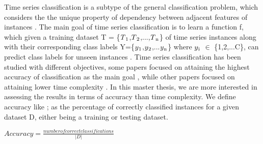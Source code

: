 Time series classification is a subtype of the general classification problem, which considers the the unique property of dependency between adjacent features of instances \cite{Bostrom2017}.
The main goal of time series classification is to learn a function f,
which given a training dataset T = \{$T\textsubscript{1}$,$T\textsubscript{2}$,...,$T\textsubscript{n}$\} of time series instances
along with their corresponding class labels Y=\{$y\textsubscript{1}$,$y\textsubscript{2}$,...$y\textsubscript{n}$\} where $y\textsubscript{i}$ $\in$ \{1,2,...C\},
can predict class labels for unseen instances \cite{deng2013time}.\newline
Time series classification has been studied with different objectives, some papers focused on attaining the highest accuracy of classification as the main goal \cite{kate2016using,jeong2011weighted,bostrom2017shapelet,lines2018time,schafer2017multivariate,fawaz2020inceptiontime},
while other papers focused on attaining lower time complexity \cite{ratanamahatana2004making,bagnall2017great,tan2020fastee,petitjean2016faster,schafer2017fast}.\newline
In this master thesis, we are more interested in assessing the results in terms of accuracy than time complexity. We define accuracy like \cite{schafer2020teaser}; 
as the percentage of correctly classified instances for a given dataset D, either being a training or testing dataset.
\begin{definition}
$Accuracy = \frac{number of correct classifications}{|D|}$
\end{definition}